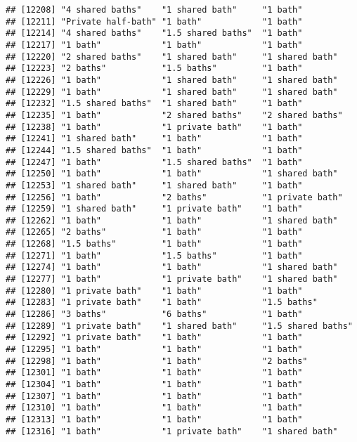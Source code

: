 \documentclass[
]{article}
\begin{document}
\begin{verbatim}
## [12208] "4 shared baths"    "1 shared bath"     "1 bath"           
## [12211] "Private half-bath" "1 bath"            "1 bath"           
## [12214] "4 shared baths"    "1.5 shared baths"  "1 bath"           
## [12217] "1 bath"            "1 bath"            "1 bath"           
## [12220] "2 shared baths"    "1 shared bath"     "1 shared bath"    
## [12223] "2 baths"           "1.5 baths"         "1 bath"           
## [12226] "1 bath"            "1 shared bath"     "1 shared bath"    
## [12229] "1 bath"            "1 shared bath"     "1 shared bath"    
## [12232] "1.5 shared baths"  "1 shared bath"     "1 bath"           
## [12235] "1 bath"            "2 shared baths"    "2 shared baths"   
## [12238] "1 bath"            "1 private bath"    "1 bath"           
## [12241] "1 shared bath"     "1 bath"            "1 bath"           
## [12244] "1.5 shared baths"  "1 bath"            "1 bath"           
## [12247] "1 bath"            "1.5 shared baths"  "1 bath"           
## [12250] "1 bath"            "1 bath"            "1 shared bath"    
## [12253] "1 shared bath"     "1 shared bath"     "1 bath"           
## [12256] "1 bath"            "2 baths"           "1 private bath"   
## [12259] "1 shared bath"     "1 private bath"    "1 bath"           
## [12262] "1 bath"            "1 bath"            "1 shared bath"    
## [12265] "2 baths"           "1 bath"            "1 bath"           
## [12268] "1.5 baths"         "1 bath"            "1 bath"           
## [12271] "1 bath"            "1.5 baths"         "1 bath"           
## [12274] "1 bath"            "1 bath"            "1 shared bath"    
## [12277] "1 bath"            "1 private bath"    "1 shared bath"    
## [12280] "1 private bath"    "1 bath"            "1 bath"           
## [12283] "1 private bath"    "1 bath"            "1.5 baths"        
## [12286] "3 baths"           "6 baths"           "1 bath"           
## [12289] "1 private bath"    "1 shared bath"     "1.5 shared baths" 
## [12292] "1 private bath"    "1 bath"            "1 bath"           
## [12295] "1 bath"            "1 bath"            "1 bath"           
## [12298] "1 bath"            "1 bath"            "2 baths"          
## [12301] "1 bath"            "1 bath"            "1 bath"           
## [12304] "1 bath"            "1 bath"            "1 bath"           
## [12307] "1 bath"            "1 bath"            "1 bath"           
## [12310] "1 bath"            "1 bath"            "1 bath"           
## [12313] "1 bath"            "1 bath"            "1 bath"           
## [12316] "1 bath"            "1 private bath"    "1 shared bath"    

\end{verbatim}
\end{document}
